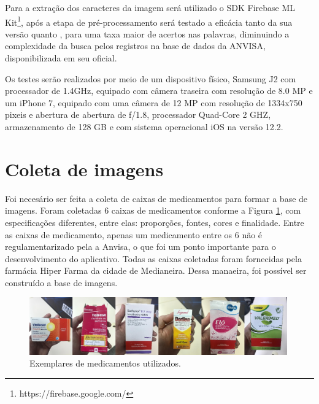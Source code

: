 Para a extração dos caracteres da imagem será utilizado o SDK Firebase ML Kit\footnote{https://firebase.google.com/}, após a etapa de pré-processamento será testado a eficácia tanto da sua versão  quanto , para uma taxa maior de acertos nas palavras, diminuindo a complexidade da busca pelos registros na base de dados da ANVISA, disponibilizada em seu  oficial.

Os testes serão realizados por meio de um dispositivo físico, Samsung J2 com processador de 1.4GHz, equipado com câmera traseira com resolução de 8.0 MP  e um iPhone 7, equipado com uma câmera de 12 MP com resolução de 1334x750 pixeis e abertura de abertura de ƒ/1.8, processador Quad-Core 2 GHZ, armazenamento de 128 GB e com sistema operacional iOS na versão 12.2.





\section{Coleta de imagens}

Foi necesário ser feita a coleta de caixas de medicamentos para formar a base de imagens. Foram coletadas 6 caixas de medicamentos conforme a Figura \ref{exemplares}, com especificações diferentes, entre elas: proporções, fontes, cores e finalidade. Entre as caixas de medicamento, apenas um medicamento entre os 6 não é regulamentarizado pela a Anvisa, o que foi um ponto importante para o desenvolvimento do aplicativo. Todas as caixas coletadas foram fornecidas pela farmácia Hiper Farma da cidade de Medianeira. Dessa manaeira, foi possível ser construído a base de imagens.

 \begin{figure}[h!]
	\centering
	\includegraphics[width=0.99\textwidth]{Imagens/exemplares.jpg} 
	\caption[Exemplares de medicamentos utilizados.]{Exemplares de medicamentos utilizados.}
	\label{exemplares}
\end{figure}


